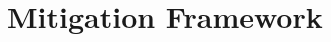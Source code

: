 \chapter{Mitigation Framework}
\label{chap:mitigation}

\lipsum[100]
\lipsum[100]
\lipsum[100]
\lipsum[100]
\lipsum[100]

